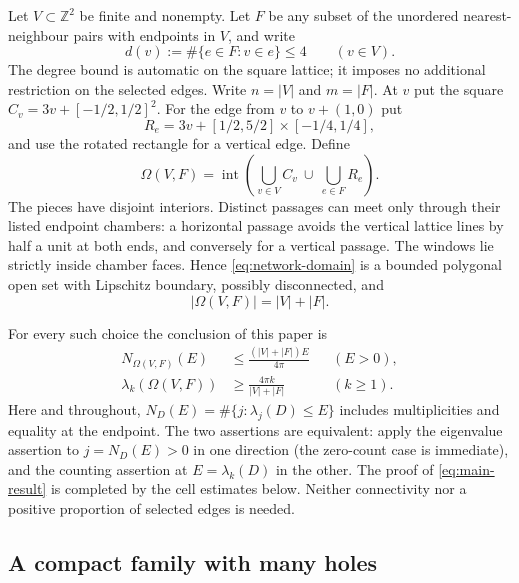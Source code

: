 \documentclass[11pt,reqno]{amsart}
\numberwithin{equation}{section}
\newcommand{\Z}{\mathbb Z}
\newcommand{\abs}[1]{\lvert#1\rvert}
\newcommand{\Om}{\Omega}
\begin{document}
Let $V\subset\Z^2$ be finite and nonempty. Let $F$ be any subset of
the unordered nearest-neighbour pairs with endpoints in $V$, and
write
\begin{equation}\label{eq:degree}
 d(v):=\#\{e\in F:v\in e\}\le4\qquad(v\in V).
\end{equation}
The degree bound is automatic on the square lattice; it imposes
no additional restriction on the selected edges.
Write $n=\abs V$ and $m=\abs F$.
At $v$ put the square $C_v=3v+[-1/2,1/2]^2$. For the edge from $v$
to $v+(1,0)$ put
\[
 R_e=3v+[1/2,5/2]\times[-1/4,1/4],
\]
and use the rotated rectangle for a vertical edge. Define
\begin{equation}\label{eq:network-domain}
 \Om(V,F)=\operatorname{int}\left(
 \bigcup_{v\in V}C_v\ \cup\ \bigcup_{e\in F}R_e\right).
\end{equation}
The pieces have disjoint interiors. Distinct passages can meet
only through their listed endpoint chambers: a horizontal passage
avoids the vertical lattice lines by half a unit at both ends,
and conversely for a vertical passage. The windows lie strictly
inside chamber faces. Hence \eqref{eq:network-domain} is a bounded
polygonal open set with Lipschitz boundary, possibly disconnected,
and
\begin{equation}\label{eq:physical-area}
 \abs{\Om(V,F)}=\abs V+\abs F.
\end{equation}

For every such choice the conclusion of this paper is
\begin{equation}\label{eq:main-result}
 \boxed{\begin{aligned}
  N_{\Om(V,F)}(E)&\le\frac{(\abs V+\abs F)E}{4\pi}
       &&(E>0),\\
  \lambda_k(\Om(V,F))&\ge\frac{4\pi k}{\abs V+\abs F}
       &&(k\ge1).
 \end{aligned}}
\end{equation}
Here and throughout,
$N_D(E)=\#\{j:\lambda_j(D)\le E\}$ includes multiplicities and
equality at the endpoint. The two assertions are equivalent:
apply the eigenvalue assertion to $j=N_D(E)>0$ in one direction
(the zero-count case is immediate),
and the counting assertion at $E=\lambda_k(D)$ in the other.
The proof of \eqref{eq:main-result} is completed by the cell
estimates below. Neither connectivity nor a positive proportion
of selected edges is needed.

\subsection{A compact family with many holes}
\end{document}
